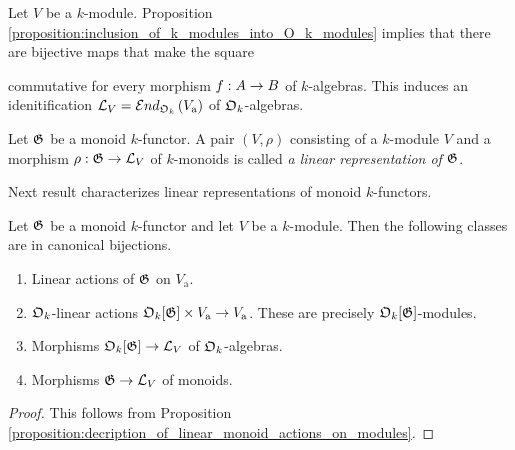 \begin{remark}\label{remark:general_linear_monoid}
Let $V$ be a $k$-module. Proposition \ref{proposition:inclusion_of_k_modules_into_O_k_modules} implies that there are bijective maps that make the square
\begin{center}
\end{center}
commutative for every morphism $f:A\rightarrow B$ of $k$-algebras. This induces an idenitification ${\mathcal L}_V = {\mathcal E} nd_{{\mathfrak O}_k}\left(V_{\mathrm{a}}\right)$ of ${\mathfrak O}_k$-algebras.
\end{remark}

\begin{definition}
Let ${\mathfrak G}$ be a monoid $k$-functor. A pair $\left(V,\rho\right)$ consisting of a $k$-module $V$ and a morphism $\rho:{\mathfrak G}\rightarrow {\mathcal L}_V$ of $k$-monoids is called \textit{a linear representation of ${\mathfrak G}$}.
\end{definition}
\noindent
Next result characterizes linear representations of monoid $k$-functors.

\begin{corollary}\label{corollary:linear_representations_various_characterizations}
Let ${\mathfrak G}$ be a monoid $k$-functor and let $V$ be a $k$-module. Then the following classes are in canonical bijections.
\begin{enumerate}[label=\emph{\textbf{(\arabic*)}}, leftmargin=1.5em]
\item Linear actions of ${\mathfrak G}$ on $V_{\mathrm{a}}$.
\item ${\mathfrak O}_k$-linear actions ${\mathfrak O}_k[{\mathfrak G}]\times V_{\mathrm{a}}\rightarrow V_{\mathrm{a}}$. These are precisely ${\mathfrak O}_k[{\mathfrak G}]$-modules.
\item Morphisms ${\mathfrak O}_k[{\mathfrak G}]\rightarrow {\mathcal L}_V$ of ${\mathfrak O}_k$-algebras.
\item Morphisms ${\mathfrak G}\rightarrow {\mathcal L}_V$ of monoids.
\end{enumerate}
\end{corollary}
\begin{proof}
This follows from Proposition \ref{proposition:decription_of_linear_monoid_actions_on_modules}.
\end{proof}

